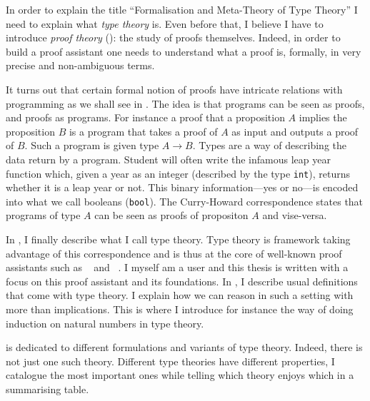 In order to explain the title ``Formalisation and Meta-Theory of Type Theory''
I need to explain what \emph{type theory} is. Even before that, I believe I have
to introduce \emph{proof theory} (): the study of proofs
themselves. Indeed, in order to build a proof assistant one needs to understand
what a proof is, formally, \ie in very precise and non-ambiguous terms.

It turns out that certain formal notion of proofs have intricate relations with
programming as we shall see in . The idea is that programs
can be seen as proofs, and proofs as programs.
For instance a proof that a proposition \(A\) implies the proposition \(B\)
is a program that takes a proof of \(A\) as input and outputs a proof of \(B\).
Such a program is given type \(A \to B\). Types are a way of describing the data
return by a program. Student will often write the infamous leap year function
which, given a year as an integer (described by the type
\texttt{int}), returns whether it is a leap year or not. This binary
information---yes or no---is encoded into what we call booleans
(\texttt{bool}).
The Curry-Howard correspondence states that programs of type \(A\) can be seen
as proofs of propositon \(A\) and vise-versa.

In , I finally describe what I call type theory.
Type theory is framework taking advantage of this correspondence and is thus at
the core of well-known proof assistants such as \Coq~ and
\Agda~. I myself am a \Coq user and this thesis is
written with a focus on this proof assistant and its foundations.
In , I describe usual definitions that come with type theory.
I explain how we can reason in such a setting with more than implications.
%
This is where I introduce for instance the way of doing induction on natural
numbers in type theory.

 is dedicated to different formulations and variants of type
theory. Indeed, there is not just one such theory. Different type theories have
different properties, I catalogue the most important ones while telling which
theory enjoys which in a summarising table.

